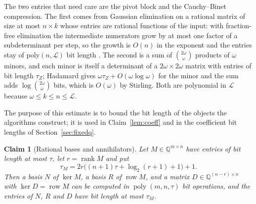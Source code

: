 \documentclass[journal]{IEEEtran}
\theoremstyle{plainn}
\newtheorem{claim}{Claim}
\theoremstyle{remark}
\begin{document}
The two entries that need care are the pivot block and the Cauchy--Binet compression. The first comes
from Gaussian elimination on a rational matrix of size at most $n\times k$ whose entries are rational
functions of the input: with fraction-free elimination the intermediate numerators grow by at most one
factor of a subdeterminant per step, so the growth is $O(n)$ in the exponent and the entries stay of
poly$(n,\mathcal L)$ bit length \cite[Ch.~6]{vzgg13}. The second is a sum of $\binom{2\omega}{\omega}$
products of $\omega$ minors, and each minor is itself a determinant of a $2\omega\times2\omega$ matrix
with entries of bit length $\tau_Z$; Hadamard gives $\omega\tau_Z+O(\omega\log\omega)$ for the minor and
the sum adds $\log\binom{2\omega}{\omega}$ bits, which is $O(\omega)$ by Stirling. Both are polynomial
in $\mathcal L$ because $\omega\le k\le n\le\mathcal L$.

The purpose of this estimate is to bound the bit length of the objects the algorithms construct; it is used in Claim~\ref{lem:coeff} and in the coefficient bit lengths of Section~\ref{sec:fixedq}.

\begin{claim}[Rational bases and annihilators]\label{lem:rationalbasis}
Let $M\in\mathbb Q^{m\times n}$ have entries of bit length at most $\tau$, let $r=\operatorname{rank}M$
and put
\begin{equation*}
\tau_M=2r\bigl((n+1)\tau+\log_2(r+1)+1\bigr)+1 .
\end{equation*}
Then a basis $N$ of $\ker M$, a basis $R$ of $\operatorname{row}M$, and a matrix
$D\in\mathbb Q^{(n-r)\times n}$ with $\ker D=\operatorname{row}M$ can be computed in
$\operatorname{poly}(m,n,\tau)$ bit operations, and the entries of $N$, $R$ and $D$ have bit length at
most $\tau_M$.
\end{claim}
\end{document}
